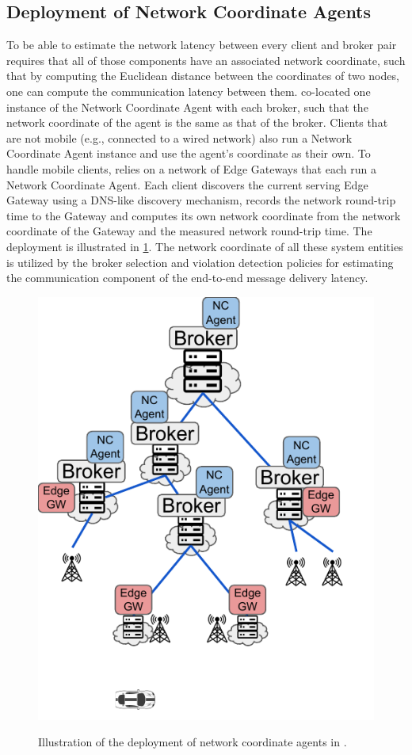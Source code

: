 \subsection{Deployment of Network Coordinate Agents}
To be able to estimate the network latency between every client and broker pair requires that all of those components have an associated network coordinate, such that by computing the Euclidean distance between the coordinates of two nodes, one can compute the communication latency between them. \epulsar{} co-located one instance of the Network Coordinate Agent with each broker, such that the network coordinate of the agent is the same as that of the broker. Clients that are not mobile (e.g., connected to a wired network) also run a Network Coordinate Agent instance and use the agent's coordinate as their own. To handle mobile clients, \epulsar{} relies on a network of Edge Gateways that each run a Network Coordinate Agent. Each client discovers the current serving Edge Gateway using a DNS-like discovery mechanism, records the network round-trip time to the Gateway and computes its own network coordinate from the network coordinate of the Gateway and the measured network round-trip time. The deployment is illustrated in \cref{fig:epulsar_nc_deployment}. The network coordinate of all these system entities is utilized by the broker selection and violation detection policies for estimating the communication component of the end-to-end message delivery latency. 
\begin{figure}[h]
\centering
\includegraphics[width=0.5\columnwidth]{figures/epulsar/nc_agent_deployment}
\label{fig:epulsar_nc_deployment}
\caption{Illustration of the deployment of network coordinate agents in \epulsar{}.}
\end{figure}

